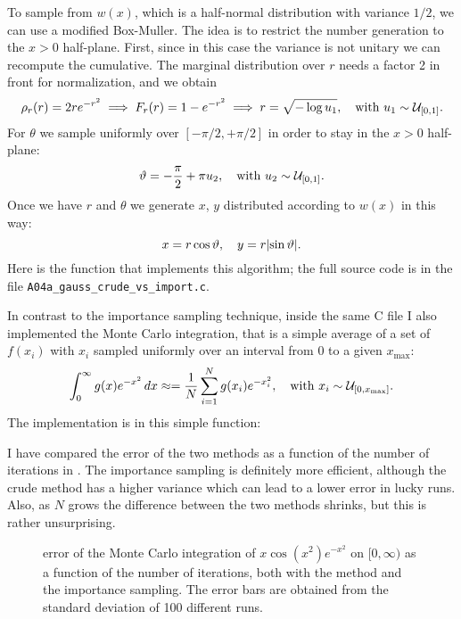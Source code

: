 To sample from $w(x)$, which is a half-normal distribution with variance $1/2$,
we can use a modified Box-Muller. The idea is to restrict the number generation
to the $x > 0$ half-plane. First, since in this case the variance is not unitary
we can recompute the cumulative. The marginal distribution over $r$ needs a
factor \num{2} in front for normalization, and we obtain
\begin{equation}
    \rho_r(r) = 2re^{-r^{2}} \implies F_r(r) = 1 - e^{-r^{2}} \implies
    r = \sqrt{-\log u_1}, \quad\text{with } u_1 \sim \mathcal{U}_{[0, 1]}.
\end{equation}
For $\theta$ we sample uniformly over $[-\pi/2, +\pi/2]$ in order to stay in the
$x > 0$ half-plane:
\begin{equation}
    \vartheta = -\frac{\pi}{2} + \pi u_2, \quad
    \text{with } u_2 \sim \mathcal{U}_{[0, 1]}.
\end{equation}
Once we have $r$ and $\theta$ we generate $x$, $y$ distributed according to
$w(x)$ in this way:
\begin{equation}
    x = r \cos\theta,\quad y = r\abs{\sin\theta}.
\end{equation}
Here is the function that implements this algorithm; the full source code is in
the file \texttt{A04a\_gauss\_crude\_vs\_import.c}.


In contrast to the importance sampling technique, inside the same C file I also
implemented the  Monte Carlo integration, that is a simple
average of a set of $f(x_i)$ with $x_i$ sampled uniformly over an interval from
$0$ to a given $x_{\mathrm{max}}$:
\begin{equation}
    \int_{0}^{\infty} g(x) e^{-x^{2}}\, dx \approx
    = \frac{1}{N} \sum_{i = 1}^{N} g(x_i) e^{-x_i^2}, \quad
    \text{with } x_i \sim \mathcal{U}_{[0, x_{\mathrm{max}}]}.
\end{equation}
The implementation is in this simple function:


I have compared the error of the two methods as a function of the number of
iterations in . The importance sampling is definitely
more efficient, although the crude method has a higher variance which can lead
to a lower error in lucky runs. Also, as $N$ grows the difference between the
two methods shrinks, but this is rather unsurprising.

\begin{figure}
    \centering
    
    \caption{error of the Monte Carlo integration of $x \cos(x^{2}) e^{-x^{2}}$
        on $[0, \infty)$ as a function of the number of iterations, both with
        the  method and the importance sampling. The error bars
        are obtained from the standard deviation of \num{100} different runs.}
    \label{fig:A04a}
\end{figure}

